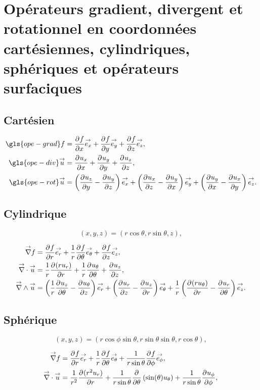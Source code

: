 \section[Opérateurs différentiels surfaciques sur 3 géométries]{Opérateurs gradient, divergent et rotationnel en coordonnées cartésiennes, cylindriques, sphériques et opérateurs surfaciques}
\label{sec:annexe:div_grad_rot}
\subsection{Cartésien}

    \begin{align}
        \gls{ope-grad} f &= \ddr{x}{f}\vect{e_x} + \ddr{y}{f}\vect{e_y}  + \ddr{z}{f}\vect{e_z}, \\
        \gls{ope-div} \vu &= \ddr{x}{u_x} + \ddr{y}{u_y} + \ddr{z}{u_z}, \\
        \gls{ope-rot} \vu &= \left(\ddr{y}{u_z}-\ddr{z}{u_y}\right)\vect{e_x} + \left(\ddr{z}{u_x}-\ddr{x}{u_y}\right)\vect{e_y} + \left(\ddr{x}{u_y}-\ddr{y}{u_x}\right)\vect{e_z}.
    \end{align}

\subsection{Cylindrique}

    \[
        (x,y,z) = (r\cos\theta,r\sin\theta,z),
    \]

    \begin{align}
        \vgrad f &= \ddr{r}{f}\vect{e_r}
        +\frac{1}{r}\ddr{\theta}{f}\vect{e_\theta} + \ddr{z}{f}\vect{e_z},
        \\
        \vdiv \vu &= \frac{1}{r}\ddr{r}{(ru_r)}+\frac{1}{r}\ddr{\theta}{u_\theta}+\ddr{z}{u_z},
        \\
        \vrot \vu &= \left(\frac{1}{r}\ddr{\theta}{u_z} - \ddr{z}{u_\theta}\right)\vect{e_r} +
        \left(\ddr{z}{u_r} - \ddr{r}{u_z}\right)\vect{e_\theta} +
        \frac{1}{r}\left(\ddr{r}{(ru_\theta)}-\ddr{\theta}{u_r}\right)\vect{e_z}.
    \end{align}

\subsection{Sphérique}

    \[
        (x,y,z) = (r\cos\phi\sin\theta,r\sin\theta\sin\theta,r\cos\theta),
    \]

    \begin{align}
        \vgrad f &= \ddr{r}{f}\vect{e_r}
        +\frac{1}{r}\ddr{\theta}{f}\vect{e_\theta} + \frac{1}{r\sin\theta}\ddr{\phi}{f}\vect{e_\phi},
        \\
        \vdiv \vu &= \frac{1}{r^2}\ddr{r}{(r^2u_r)}
        + \frac{1}{r\sin\theta}\ddr{\theta}{}\left(\sin(\theta)u_\theta\right) + \frac{1}{r\sin\theta}\ddr{\phi}{u_\phi},
    \end{align}

